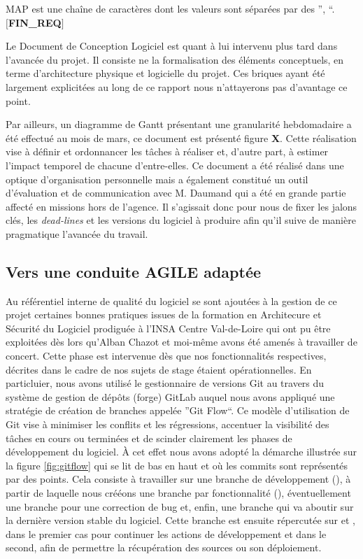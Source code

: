     \hspace{10mm} MAP est une chaîne de caractères dont les valeurs sont séparées par des '', ``.\\ 
  \textbf{$[$FIN\_REQ$]$}
  
  Le Document de Conception Logiciel est quant à lui intervenu plus tard dans l'avancée du projet. 
  Il consiste ne la formalisation des éléments conceptuels, en terme d'architecture physique et logicielle du projet. 
  Ces briques ayant été largement explicitées au long de ce rapport nous n'attayerons pas d'avantage ce point. 
  
  Par ailleurs, un diagramme de Gantt présentant une granularité hebdomadaire a été effectué au mois de mars, ce document est présenté figure \textbf{X}.
  Cette réalisation vise à définir et ordonnancer les tâches à réaliser et, d'autre part, à estimer l'impact temporel de chacune d'entre-elles. 
  Ce document a été réalisé dans une optique d'organisation personnelle mais a également constitué un outil d'évaluation et de communication avec M. Daumand qui a été en grande partie affecté en missions hors de l'agence. 
  Il s'agissait donc pour nous de fixer les jalons clés, les \emph{dead-lines} et les versions du logiciel à produire afin qu'il suive de manière pragmatique l'avancée du travail. 
  
  \subsection{Vers une conduite AGILE adaptée}
  
  Au référentiel interne de qualité du logiciel se sont ajoutées à la gestion de ce projet certaines bonnes pratiques issues de la formation en Architecure et Sécurité du Logiciel prodiguée à l'INSA Centre Val-de-Loire
  qui ont pu être exploitées dès lors qu'Alban Chazot et moi-même avons été amenés à travailler de concert.
  Cette phase est intervenue dès que nos fonctionnalités respectives, décrites dans le cadre de nos sujets de stage étaient opérationnelles.  
  En particluier, nous avons utilisé le gestionnaire de versions Git au travers du système de gestion de dépôts (forge) GitLab auquel nous avons appliqué une stratégie de création de branches appelée ''Git Flow``.
  Ce modèle d'utilisation de Git vise à minimiser les conflits et les régressions, accentuer la visibilité des tâches en cours ou terminées et de scinder clairement les phases de développement du logiciel. 
  \`{A} cet effet nous avons adopté la démarche illustrée sur la figure \ref{fig:gitflow} qui se lit de bas en haut et où les commits sont représentés par des points.
  Cela consiste à travailler sur une branche de développement (), à partir de laquelle nous crééons une branche par fonctionnalité (), éventuellement une branche  pour une correction de bug
  et, enfin, une branche  qui va aboutir sur la dernière version stable du logiciel.
  Cette branche est ensuite répercutée sur  et , dans le premier cas  pour continuer les actions de développement et dans le second, afin de permettre la récupération des sources ou son déploiement. 
  
